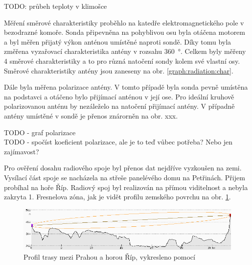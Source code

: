 \documentclass[twoside]{ctuthesis}
\theoremstyle{plain}
\theoremstyle{definition}
\theoremstyle{note}
\begin{document}
	TODO: průbeh teploty v klimošce

	Měření směrové charakteristiky proběhlo na katedře elektromagnetického pole v bezodrazné komoře. Sonda připevněna na pohyblivou osu byla otáčena motorem a byl měřen přijatý výkon anténou umístěné naproti sondě. Díky tomu byla změřena vyzařovací charakteristika antény v rozsahu 360~°. Celkem byly měřeny 4 směrové charakteristiky a to pro různá natočení sondy kolem své vlastní osy. Směrové charakteristiky antény jsou zaneseny na obr. \ref{graph:radiation:char}.

	


	Dále byla měřena polarizace antény. V tomto případě byla sonda pevně umístěna na podstavci a otáčeno bylo přijímací anténou v její ose. Pro ideální kruhově polarizovanou anténu by nezáleželo na natočení přijímací antény. V případně antény umístěné v sondě je přenos znárorněn na obr. xxx.

	TODO - graf polarizace\\
	TODO - spočíst koeficient polarizace, ale je to teď vůbec potřeba? Nebo jen zajímavost?

	Pro ověření dosahu radiového spoje byl přenos dat nejdříve vyzkoušen na zemi. Vysílací část spoje se nacházela na střeše panelévého domu na Petřinách. Přijem probíhal na hoře Říp. Radiový spoj byl realizován na přímou viditelnost a nebyla zakryta 1. Fresnelova zóna, jak je vidět profilu zemského povrchu na obr. \ref{fig:praha:rip}.

	\begin{figure}[hbtp]
		\centering
		\includegraphics[width=\textwidth]{Figures/petriny_rip.png}
		\caption{Profil trasy mezi Prahou a horou Říp, vykresleno pomocí \cite{rozhled}}
		\label{fig:praha:rip}
	\end{figure}






	

	
\end{document}
